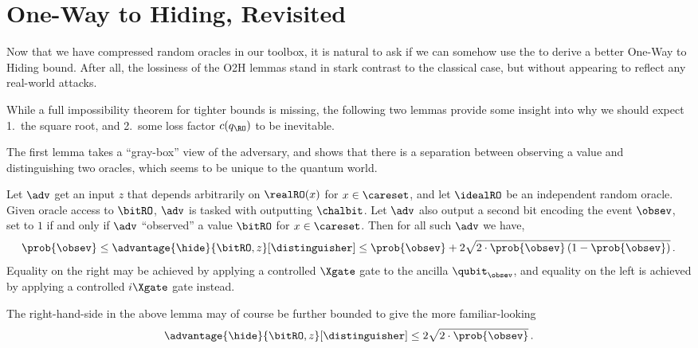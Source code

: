 \section{One-Way to Hiding, Revisited}\label{sec:improving-o2h}
  Now that we have compressed random oracles in our toolbox, it is natural to
    ask if we can somehow use the to derive a better One-Way to Hiding bound.
    After all, the lossiness of the O2H lemmas stand in stark contrast to the
    classical case, but without appearing to reflect any real-world attacks.


  While a full impossibility theorem for tighter bounds is missing, the
    following two lemmas provide some insight into why we should expect
    1.\ the square root, and 2.\ some loss factor $c(q_{\RO})$
    to be inevitable.

  The first lemma takes a ``gray-box'' view of the adversary, and shows that
    there is a separation between observing a value and distinguishing two
    oracles, which seems to be unique to the quantum world.

  \begin{lemma}
    Let $\adv$ get an input $z$ that depends arbitrarily on $\realRO(x)$ for $x
      \in \careset$, and let
      $\idealRO$ be an independent random oracle. Given oracle access to
      $\bitRO$, $\adv$ is tasked with outputting $\chalbit$. Let $\adv$
      also output a second bit encoding the event $\obsev$, set to
      $1$ if and only if $\adv$ ``observed'' a value $\bitRO$ for $x \in
      \careset$. Then for all such $\adv$ we have, 
      \[ 
        \prob{\obsev} \leq 
          \advantage{\hide}{\bitRO, z}[\distinguisher] 
          \leq \prob{\obsev} 
          + 2 \sqrt{ 
            2 \cdot \prob{\obsev} \left( 1 - \prob{\obsev} \right)
          }\, .
      \]
      Equality on the right may be achieved by applying a controlled $\Xgate$
      gate to the ancilla $\qubit_\obsev$, and equality on the left is achieved by
      applying a controlled $i \Xgate$ gate instead.
  \end{lemma}

  \noindent
  The right-hand-side in the above lemma may of course be further bounded to give the
  more familiar-looking
  \[ 
    \advantage{\hide}{\bitRO, z}[\distinguisher] 
      \leq 2 \sqrt{2 \cdot \prob{\obsev}}\, .
  \]

